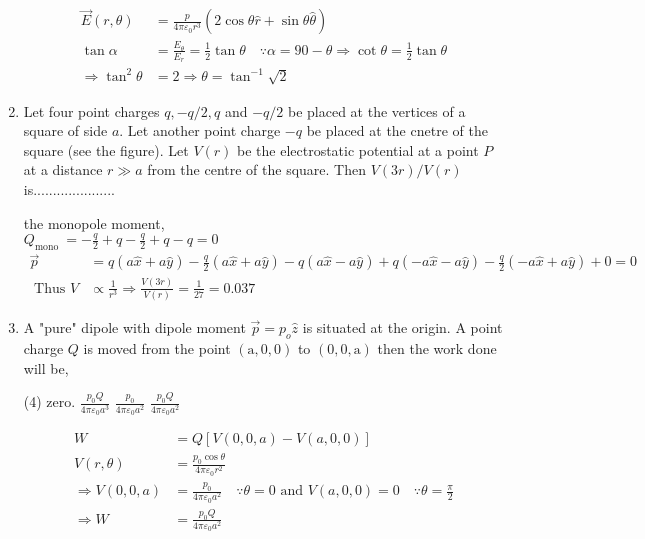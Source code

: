 \begin{enumerate}[label=\color{ocre}\textbf{\arabic*.}]
\begin{answer}
	
	\begin{align*}
	\vec{E}(r, \theta)&=\frac{p}{4 \pi \varepsilon_{0} r^{3}}(2 \cos \theta \hat{r}+\sin \theta \hat{\theta}) \\
	\tan \alpha&=\frac{E_{\theta}}{E_{r}}=\frac{1}{2} \tan \theta \quad \because \alpha=90-\theta \Rightarrow \cot \theta=\frac{1}{2} \tan \theta \\
	\Rightarrow \tan ^{2} \theta&=2 \Rightarrow \theta=\tan ^{-1} \sqrt{2}
	\end{align*}
	
\end{answer}
\item Let four point charges $q,-q / 2, q$ and $-q / 2$ be placed at the vertices of a square of
side $a$. Let another point charge $-q$ be placed at the cnetre of the square (see the figure).
Let $V(r)$ be the electrostatic potential at a point $P$ at a distance $r \gg a$ from the centre of
the square. Then $V(3 r) / V(r)$ is.....................
\begin{answer} the monopole moment,\\
	$Q_{\text {mono }}=-\frac{q}{2}+q-\frac{q}{2}+q-q=0$
	\begin{align*}
	\vec{p}&=q(a \hat{x}+a \hat{y})-\frac{q}{2}(a \hat{x}+a \hat{y})-q(a \hat{x}-a \hat{y})+q(-a \hat{x}-a \hat{y})-\frac{q}{2}(-a \hat{x}+a \hat{y})+0=0 \\
	\text { Thus } V &\propto \frac{1}{r^{3}} \Rightarrow \frac{V(3 r)}{V(r)}=\frac{1}{27}=0.037
	\end{align*}
	
\end{answer}
\item A "pure" dipole with dipole moment $\vec{p}=p_{o} \hat{z}$ is situated at the origin. A point charge $Q$ is
moved from the point $(\mathrm{a}, 0,0)$ to $(0,0, \mathrm{a})$ then the work done will be,
\begin{tasks}(4)
	\task[\textbf{a.}]  zero. 
	\task[\textbf{b.}]$\frac{p_{0} Q}{4 \pi \varepsilon_{0} a^{3}}$
	\task[\textbf{c.}] $\frac{p_{0}}{4 \pi \varepsilon_{0} a^{2}}$
	\task[\textbf{d.}] $\frac{p_{0} Q}{4 \pi \varepsilon_{0} a^{2}}$
\end{tasks}
\begin{answer}
	\begin{align*}
	W&=Q[V(0,0, a)-V(a, 0,0)]\\
	V(r, \theta)&=\frac{p_{0} \cos \theta}{4 \pi \varepsilon_{0} r^{2}}\\ \Rightarrow V(0,0, a)&=\frac{p_{0}}{4 \pi \varepsilon_{0} a^{2}} \quad \because \theta=0 \text { and } V(a, 0,0)=0 \quad \because \theta=\frac{\pi}{2}\\
	\Rightarrow W&=\frac{p_{0} Q}{4 \pi \varepsilon_{0} a^{2}}
	\end{align*}
	
\end{answer}

\end{enumerate}
